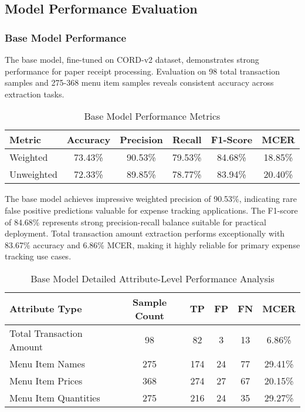 \subsection{Model Performance Evaluation}

\subsubsection{Base Model Performance}
The base model, fine-tuned on CORD-v2 dataset, demonstrates strong performance for paper receipt processing. Evaluation on 98 total transaction samples and 275-368 menu item samples reveals consistent accuracy across extraction tasks.

\begin{table}[htbp]
\centering
\caption{Base Model Performance Metrics}
\label{tab:base-model-results}
\begin{tabular}{|l|c|c|c|c|c|}
\hline
\textbf{Metric} & \textbf{Accuracy} & \textbf{Precision} & \textbf{Recall} & \textbf{F1-Score} & \textbf{MCER} \\
\hline
Weighted & 73.43\% & 90.53\% & 79.53\% & 84.68\% & 18.85\% \\
Unweighted & 72.33\% & 89.85\% & 78.77\% & 83.94\% & 20.40\% \\
\hline
\end{tabular}
\end{table}

The base model achieves impressive weighted precision of 90.53\%, indicating rare false positive predictions valuable for expense tracking applications. The F1-score of 84.68\% represents strong precision-recall balance suitable for practical deployment. Total transaction amount extraction performs exceptionally with 83.67\% accuracy and 6.86\% MCER, making it highly reliable for primary expense tracking use cases.

\begin{table}[htbp]
\centering
\caption{Base Model Detailed Attribute-Level Performance Analysis}
\label{tab:base-model-detail}
\begin{tabular}{|l|c|c|c|c|c|}
\hline
\textbf{Attribute Type} & \textbf{Sample Count} & \textbf{TP} & \textbf{FP} & \textbf{FN} & \textbf{MCER} \\
\hline
Total Transaction Amount & 98 & 82 & 3 & 13 & 6.86\% \\
Menu Item Names & 275 & 174 & 24 & 77 & 29.41\% \\
Menu Item Prices & 368 & 274 & 27 & 67 & 20.15\% \\
Menu Item Quantities & 275 & 216 & 24 & 35 & 29.27\% \\
\hline
\end{tabular}
\end{table}

